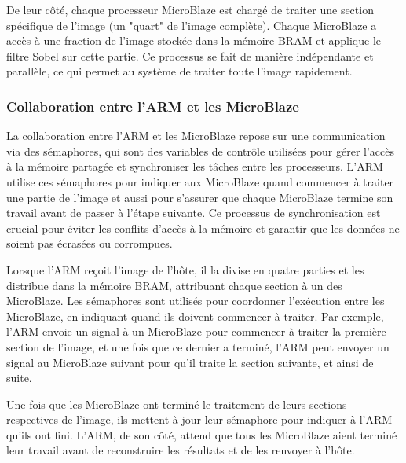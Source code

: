 \documentclass[../CSC_5RO07_TA.tex]{subfiles}
\begin{document}
\vspace{1em} 

De leur côté, chaque processeur MicroBlaze est chargé de traiter une section spécifique de l'image (un "quart" de l'image complète). Chaque MicroBlaze a accès à une fraction de l'image stockée dans la mémoire BRAM et applique le filtre Sobel sur cette partie. Ce processus se fait de manière indépendante et parallèle, ce qui permet au système de traiter toute l'image rapidement.

\vspace{1em} 

\subsubsection{Collaboration entre l'ARM et les MicroBlaze}
La collaboration entre l'ARM et les MicroBlaze repose sur une communication via des sémaphores, qui sont des variables de contrôle utilisées pour gérer l'accès à la mémoire partagée et synchroniser les tâches entre les processeurs. L'ARM utilise ces sémaphores pour indiquer aux MicroBlaze quand commencer à traiter une partie de l'image et aussi pour s'assurer que chaque MicroBlaze termine son travail avant de passer à l'étape suivante. Ce processus de synchronisation est crucial pour éviter les conflits d'accès à la mémoire et garantir que les données ne soient pas écrasées ou corrompues.

\vspace{1em} 

Lorsque l'ARM reçoit l'image de l'hôte, il la divise en quatre parties et les distribue dans la mémoire BRAM, attribuant chaque section à un des MicroBlaze. Les sémaphores sont utilisés pour coordonner l'exécution entre les MicroBlaze, en indiquant quand ils doivent commencer à traiter. Par exemple, l'ARM envoie un signal à un MicroBlaze pour commencer à traiter la première section de l'image, et une fois que ce dernier a terminé, l'ARM peut envoyer un signal au MicroBlaze suivant pour qu'il traite la section suivante, et ainsi de suite.

\vspace{1em} 

Une fois que les MicroBlaze ont terminé le traitement de leurs sections respectives de l'image, ils mettent à jour leur sémaphore pour indiquer à l'ARM qu'ils ont fini. L'ARM, de son côté, attend que tous les MicroBlaze aient terminé leur travail avant de reconstruire les résultats et de les renvoyer à l'hôte.

\vspace{1em} 
\end{document}
